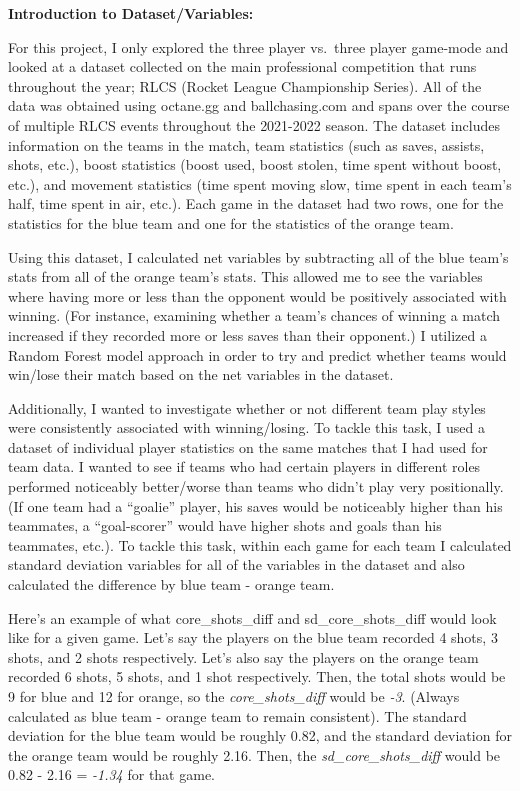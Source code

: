 \documentclass[
  letterpaper,
  DIV=11,
  numbers=noendperiod]{scrartcl}
\begin{document}
\textbf{Introduction to Dataset/Variables:}

For this project, I only explored the three player vs.~three player
game-mode and looked at a dataset collected on the main professional
competition that runs throughout the year; RLCS (Rocket League
Championship Series). All of the data was obtained using octane.gg and
ballchasing.com and spans over the course of multiple RLCS events
throughout the 2021-2022 season. The dataset includes information on the
teams in the match, team statistics (such as saves, assists, shots,
etc.), boost statistics (boost used, boost stolen, time spent without
boost, etc.), and movement statistics (time spent moving slow, time
spent in each team's half, time spent in air, etc.). Each game in the
dataset had two rows, one for the statistics for the blue team and one
for the statistics of the orange team.

Using this dataset, I calculated net variables by subtracting all of the
blue team's stats from all of the orange team's stats. This allowed me
to see the variables where having more or less than the opponent would
be positively associated with winning. (For instance, examining whether
a team's chances of winning a match increased if they recorded more or
less saves than their opponent.) I utilized a Random Forest model
approach in order to try and predict whether teams would win/lose their
match based on the net variables in the dataset.

Additionally, I wanted to investigate whether or not different team play
styles were consistently associated with winning/losing. To tackle this
task, I used a dataset of individual player statistics on the same
matches that I had used for team data. I wanted to see if teams who had
certain players in different roles performed noticeably better/worse
than teams who didn't play very positionally. (If one team had a
``goalie'' player, his saves would be noticeably higher than his
teammates, a ``goal-scorer'' would have higher shots and goals than his
teammates, etc.). To tackle this task, within each game for each team I
calculated standard deviation variables for all of the variables in the
dataset and also calculated the difference by blue team - orange team.

Here's an example of what core\_shots\_diff and sd\_core\_shots\_diff
would look like for a given game. Let's say the players on the blue team
recorded 4 shots, 3 shots, and 2 shots respectively. Let's also say the
players on the orange team recorded 6 shots, 5 shots, and 1 shot
respectively. Then, the total shots would be 9 for blue and 12 for
orange, so the \emph{core\_shots\_diff} would be \emph{-3}. (Always
calculated as blue team - orange team to remain consistent). The
standard deviation for the blue team would be roughly 0.82, and the
standard deviation for the orange team would be roughly 2.16. Then, the
\emph{sd\_core\_shots\_diff} would be 0.82 - 2.16 = \emph{-1.34} for
that game.
\end{document}
